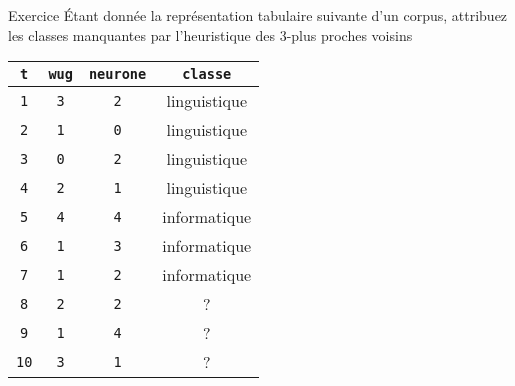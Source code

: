 \documentclass[../allslides.tex]{subfiles}
\begin{document}
\renewcommand\docdate{2021-02-18}  %



\begin{frame}{Exercice}
	Étant donnée la représentation tabulaire suivante d'un corpus, attribuez les classes manquantes par l'heuristique des \num{3}-plus proches voisins
	\begin{table}
		\begin{tabular}{*{4}{c}}
            \toprule
			\texttt{t}  & \texttt{wug} & \texttt{neurone} & \texttt{classe}\\
			\midrule
			\texttt{1}  & \texttt{3}      & \texttt{2}	& linguistique\\
			\texttt{2}  & \texttt{1}      & \texttt{0}	& linguistique\\
			\texttt{3}  & \texttt{0}      & \texttt{2}	& linguistique\\
			\texttt{4}  & \texttt{2}      & \texttt{1}	& linguistique\\
			\texttt{5}  & \texttt{4}      & \texttt{4}	& informatique\\
			\texttt{6}  & \texttt{1}      & \texttt{3}	& informatique\\
			\texttt{7}  & \texttt{1}      & \texttt{2}	& informatique\\
			\texttt{8}  & \texttt{2}      & \texttt{2}	& ?\\
			\texttt{9}  & \texttt{1}      & \texttt{4}	& ?\\
			\texttt{10}  & \texttt{3}      & \texttt{1}	& ?\\
            \bottomrule
		\end{tabular}
	\end{table}
\end{frame}
\end{document}
